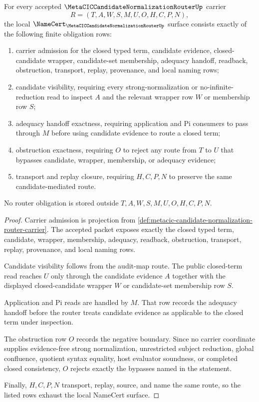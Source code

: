 \begin{theorem}
\label{thm:metacic-candidate-normalization-router-obligations}
For every accepted $\MetaCICCandidateNormalizationRouterUp$ carrier
$$
R=(T,A,W,S,M,U,O,H,C,P,N),
$$
the local $\NameCert_{\MetaCICCandidateNormalizationRouterUp}$ surface consists exactly of the following finite obligation rows:
\begin{enumerate}
\item carrier admission for the closed typed term, candidate evidence, closed-candidate wrapper, candidate-set membership, adequacy handoff, readback, obstruction, transport, replay, provenance, and local naming rows;
\item candidate visibility, requiring every strong-normalization or no-infinite-reduction read to inspect $A$ and the relevant wrapper row $W$ or membership row $S$;
\item adequacy handoff exactness, requiring application and Pi consumers to pass through $M$ before using candidate evidence to route a closed term;
\item obstruction exactness, requiring $O$ to reject any route from $T$ to $U$ that bypasses candidate, wrapper, membership, or adequacy evidence;
\item transport and replay closure, requiring $H,C,P,N$ to preserve the same candidate-mediated route.
\end{enumerate}
No router obligation is stored outside $T,A,W,S,M,U,O,H,C,P,N$.
\end{theorem}
\begin{proof}
Carrier admission is projection from \autoref{def:metacic-candidate-normalization-router-carrier}. The accepted packet exposes exactly the closed typed term, candidate, wrapper, membership, adequacy, readback, obstruction, transport, replay, provenance, and local naming rows.

Candidate visibility follows from the audit-map route. The public closed-term read reaches $U$ only through the candidate evidence $A$ together with the displayed closed-candidate wrapper $W$ or candidate-set membership row $S$.

Application and Pi reads are handled by $M$. That row records the adequacy handoff before the router treats candidate evidence as applicable to the closed term under inspection.

The obstruction row $O$ records the negative boundary. Since no carrier coordinate supplies evidence-free strong normalization, unrestricted subject reduction, global confluence, quotient syntax equality, host evaluator soundness, or completed closed consistency, $O$ rejects exactly the bypasses named in the statement.

Finally, $H,C,P,N$ transport, replay, source, and name the same route, so the listed rows exhaust the local NameCert surface.
\end{proof}

